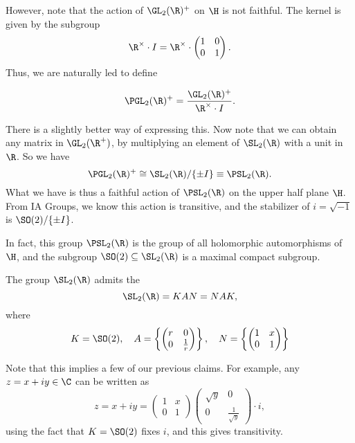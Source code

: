 \documentclass[a4paper]{article}
\begin{document}
However, note that the action of $\GL_2(\R)^+$ on $\H$ is not faithful. The kernel is given by the subgroup
\[
  \R^\times \cdot I = \R^\times \cdot
  \begin{pmatrix}
    1 & 0\\
    0 & 1
  \end{pmatrix}.
\]
Thus, we are naturally led to define
\begin{defi}[$\PGL_2(\R)^+$]
  \[
    \PGL_2(\R)^+ = \frac{\GL_2(\R)^+}{\R^\times \cdot I}.
  \]
\end{defi}
There is a slightly better way of expressing this. Now note that we can obtain any matrix in $\GL_2(\R^+)$, by multiplying an element of $\SL_2(\R)$ with a unit in $\R$. So we have 
\[
  \PGL_2(\R)^+ \cong \SL_2(\R)/\{\pm I\} \equiv \PSL_2(\R).
\]
What we have is thus a faithful action of $\PSL_2(\R)$ on the upper half plane $\H$. From IA Groups, we know this action is transitive, and the stabilizer of $i = \sqrt{-1}$ is $\SO(2)/\{\pm I\}$.

In fact, this group $\PSL_2(\R)$ is the group of all holomorphic automorphisms of $\H$, and the subgroup $\SO(2) \subseteq \SL_2(\R)$ is a maximal compact subgroup.

\begin{thm}
  The group $\SL_2(\R)$ admits the 
  \[
    \SL_2(\R) = KAN = NAK,
  \]
  where
  \[
    K = \SO(2), \quad A = \left\{
      \begin{pmatrix}
        r & 0\\
        0 & \frac{1}{r}
      \end{pmatrix}
    \right\},
    \quad N = \left\{
      \begin{pmatrix}
        1 & x\\
        0 & 1
      \end{pmatrix}
    \right\}
  \]
\end{thm}
Note that this implies a few of our previous claims. For example, any $z = x + iy \in \C$ can be written as
\[
  z = x + iy =
  \begin{pmatrix}
    1 & x\\
    0 & 1
  \end{pmatrix}
  \begin{pmatrix}
    \sqrt{y} & 0\\
    0 & \frac{1}{\sqrt{y}}
  \end{pmatrix}
  \cdot i,
\]
using the fact that $K = \SO(2)$ fixes $i$, and this gives transitivity.
\end{document}
